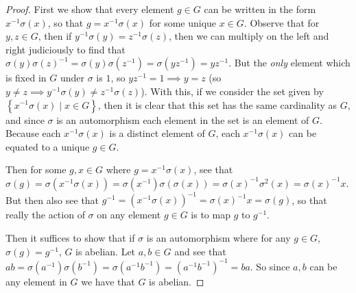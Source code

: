 \documentclass[11pt]{article}
\newcommand{\cbr}[1]{\left\{#1\right\}}
\begin{document}
\begin{enumerate}
\begin{proof}
      First we show that every element $g\in G$ can be written in the form $x^{-1}\sigma(x)$, so that $g = x^{-1}\sigma(x)$ for some unique $x\in G$. Observe that for $y,z \in G$, then if $y^{-1}\sigma(y) = z^{-1}\sigma(z)$, then we can multiply on the left and right judiciously to find that $\sigma(y)\sigma(z)^{-1} = \sigma(y)\sigma(z^{-1}) = \sigma(yz^{-1}) = yz^{-1}$. But the \textit{only} element which is fixed in $G$ under $\sigma$ is $1$, so $yz^{-1} = 1 \implies y=z$ (so $y\neq z\implies y^{-1}\sigma(y) \neq z^{-1}\sigma(z)$). With this, if we consider the set given by $\cbr{x^{-1}\sigma(x)\mid x\in G}$, then it is clear that this set has the same cardinality as $G$, and since $\sigma$ is an automorphism each element in the set is an element of $G$. Because each $x^{-1}\sigma(x)$ is a distinct element of $G$, each $x^{-1}\sigma(x)$ can be equated to a unique $g\in G$.

      Then for some $g,x \in G$ where $g = x^{-1}\sigma(x)$, see that $\sigma(g) = \sigma(x^{-1}\sigma(x)) = \sigma(x^{-1})\sigma(\sigma(x)) = \sigma(x)^{-1}\sigma^2(x) = \sigma(x)^{-1}x$. But then also see that $g^{-1} = (x^{-1}\sigma(x))^{-1} = \sigma(x)^{-1}x = \sigma(g)$, so that really the action of $\sigma$ on any element $g\in G$ is to map $g$ to $g^{-1}$.

      Then it suffices to show that if $\sigma$ is an automorphism where for any $g\in G$, $\sigma(g) = g^{-1}$, $G$ is abelian. Let $a,b\in G$ and see that $ab = \sigma(a^{-1})\sigma(b^{-1}) = \sigma(a^{-1}b^{-1}) = (a^{-1}b^{-1})^{-1} = ba$. So since $a,b$ can be any element in $G$ we have that $G$ is abelian.
    \end{proof}
    
\end{enumerate}
\end{document}
